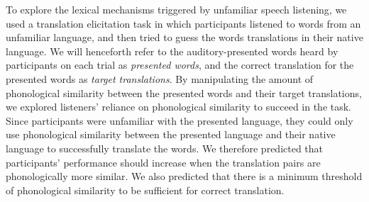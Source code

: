 \documentclass[
]{article}
\begin{document}
To explore the lexical mechanisms triggered by unfamiliar speech
listening, we used a translation elicitation task in which participants
listened to words from an unfamiliar language, and then tried to guess
the words translations in their native language. We will henceforth
refer to the auditory-presented words heard by participants on each
trial as \emph{presented words}, and the correct translation for the
presented words as \emph{target translations}. By manipulating the
amount of phonological similarity between the presented words and their
target translations, we explored listeners' reliance on phonological
similarity to succeed in the task. Since participants were unfamiliar
with the presented language, they could only use phonological similarity
between the presented language and their native language to successfully
translate the words. We therefore predicted that participants'
performance should increase when the translation pairs are
phonologically more similar. We also predicted that there is a minimum
threshold of phonological similarity to be sufficient for correct
translation.
\end{document}
